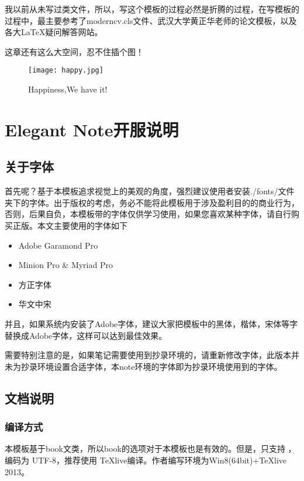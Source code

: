 \documentclass[cyan]{elegantnote}
\begin{document}
我以前从未写过类文件，所以，写这个模板的过程必然是折腾的过程，在写模板的过程中，最主要参考了moderncv.cls文件、武汉大学黄正华老师的论文模板，以及
各大\LaTeX{}疑问解答网站。

{\color{thid}这章还有这么大空间，忍不住插个图！}

\begin{figure}[!hbtp]
\texttt{[image: happy.jpg]}
\caption{Happiness,We have it!\label{figur:happy}}
\end{figure}

\chapter{Elegant Note开服说明}

\section{关于字体}

首先呢？基于本模板追求视觉上的美观的角度，强烈建议使用者安装./fonts/文件夹下的字体。出于版权的考虑，务必不能将此模板用于涉及盈利目的的商业行为，否则，后果自负，本模板带的字体仅供学习使用，如果您喜欢某种字体，请自行购买正版。本文主要使用的字体如下
\begin{itemize}
\itemsep=3pt
\parskip=0pt
\item Adobe Garamond Pro
\item Minion Pro \& Myriad Pro
\item 方正字体
\item 华文中宋
\end{itemize}

并且，如果系统内安装了Adobe字体，建议大家把模板中的黑体，楷体，宋体等字替换成Adobe字体，这样可以达到最佳效果。

\begin{note}
需要特别注意的是，如果笔记需要使用到抄录环境的，请重新修改字体，此版本并未为抄录环境设置合适字体，本note环境的字体即为抄录环境使用到的字体。
\end{note}

\section{文档说明}
\subsection{编译方式}
本模板基于book文类，所以book的选项对于本模板也是有效的。但是，只支持 \XeLaTeX{}，编码为 UTF-8，推荐使用 \TeX{}live编译。作者编写环境为Win8(64bit)+\TeX{}live 2013。
\end{document}
